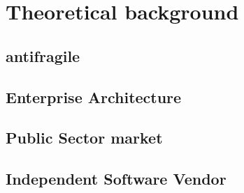 \chapter{Theoretical background}
\label{ch:theoreticalbackground}

\section{antifragile}
\label{sec:tbantifragile}
\lipsum[1]

\section{Enterprise Architecture}
\label{sec:tbea}
\lipsum[1]

\section{Public Sector market}
\label{sec:tbpsmarket}
\lipsum[1]

\section{Independent Software Vendor}
\label{sec:tbisv}
\lipsum[1]




